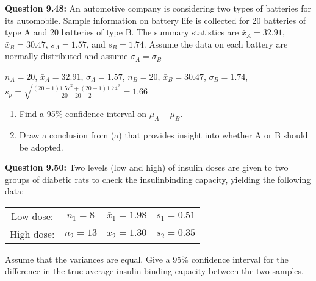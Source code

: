 \documentclass{article}
\begin{document}
\textbf{Question 9.48:}
An automotive company is considering two
types of batteries for its automobile. Sample information 
on battery life is collected for 20 batteries of
type A and 20 batteries of type B. The summary
statistics are $\bar{x}_A = 32.91$, $\bar{x}_B = 30.47$, $s_A = 1.57$,
and $s_B = 1.74$. Assume the data on each battery are
normally distributed and assume $\sigma_A = \sigma_B$
\begin{description}
    \item $n_A=20$, $\bar{x}_A=32.91$, $\sigma_A=1.57$, $n_B=20$, $\bar{x}_B=30.47$, 
    $\sigma_B=1.74$, $s_p=\sqrt{\frac{(20-1)1.57^2+(20-1)1.74^2}{20+20-2}}=1.66$
\end{description}
\begin{enumerate}[label = (\alph*) ]
    \item Find a 95\% confidence interval on $\mu_A-\mu_B$.
    \item Draw a conclusion from (a) that provides insight
    into whether A or B should be adopted.
\end{enumerate}
\textbf{Question 9.50:}
Two levels (low and high) of insulin doses are
given to two groups of diabetic rats to check the 
insulinbinding capacity, yielding the following data:
\begin{center}
\begin{tabular}{c c c c}
    Low dose: & $n_1 = 8$ & $\bar{x}_1 = 1.98$ & $s_1 = 0.51$ \\
    High dose: & $n_2 = 13$ & $\bar{x}_2 = 1.30$ & $s_2 = 0.35$
\end{tabular}
\end{center}
Assume that the variances are equal. Give a 95\% 
confidence interval for the difference in the true average
insulin-binding capacity between the two samples.\\\newline
\end{document}
